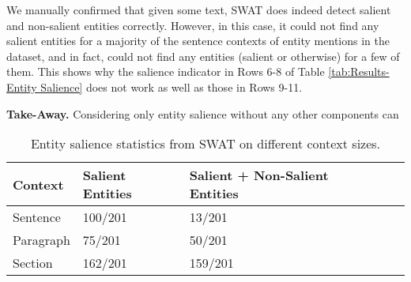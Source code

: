 \documentclass[sigconf,authordraft]{acmart}
\begin{document}
We manually confirmed that given some text, SWAT does indeed detect salient and non-salient entities correctly. However, in this case, it could not find any salient entities for a majority of the sentence contexts of entity mentions in the dataset, and in fact, could not find any entities (salient or otherwise) for a few of them. This shows why the salience indicator in Rows 6-8 of Table \ref{tab:Results-Entity Salience} does not work as well as those in Rows 9-11.

\textbf{Take-Away.} Considering only entity salience without any other components can 

\begin{table}
    \caption{Entity salience statistics from SWAT on different context sizes.}
    \label{tab:Results-Entity Salience-Stats}
    \begin{tabular}{@{}lllll@{}}
        \toprule
        Context & 
        Salient Entities & 
        Salient + Non-Salient Entities
        \\

        \midrule
        
         Sentence & 
         100/201 &  
         13/201
         \\
         
         Paragraph & 
         75/201 &  
         50/201 
         \\
         
         Section & 
         162/201 &  
         159/201 
         \\

        
          \bottomrule
    \end{tabular}
\end{table}
\end{document}

